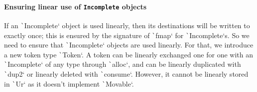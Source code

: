 \documentclass[english]{jflart}
\begin{document}




\paragraph{Ensuring linear use of \texttt{Incomplete} objects}

If an \texttt`Incomplete` object is used linearly, then its destinations will be written to exactly once; this is ensured by the signature of \texttt`fmap` for \texttt`Incomplete`s. So we need to ensure that \texttt`Incomplete` objects are used linearly. For that, we introduce a new token type \texttt`Token`. A token can be linearly exchanged one for one with an \texttt`Incomplete` of any type through \texttt`alloc`, and can be linearly duplicated with \texttt`dup2` or linearly deleted with \texttt`consume`. However, it cannot be linearly stored in \texttt`Ur` as it doesn't implement \texttt`Movable`.
\end{document}
